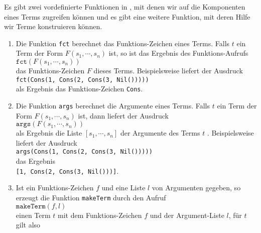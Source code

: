 Es gibt zwei vordefinierte Funktionen in \setl, mit denen wir auf die Komponenten eines Terms
zugreifen k\"{o}nnen und es gibt eine weitere Funktion, mit deren Hilfe wir Terme konstruieren k\"{o}nnen.
\begin{enumerate}
\item Die Funktion \texttt{fct} berechnet das Funktions-Zeichen eines Terms.
      Falls $t$ ein Term der Form $F(s_1,\cdots,s_n)$ ist, so ist das Ergebnis des Funktions-Aufrufs
      \\[0.2cm]
      \hspace*{1.3cm}
      $\texttt{fct}(F(s_1,\cdots,s_n))$
      \\[0.2cm]
      das Funktions-Zeichen $F$ dieses Terms.  Beispielsweise liefert der Ausdruck
      \\[0.2cm]
      \hspace*{1.3cm}
      \texttt{fct(Cons(1, Cons(2, Cons(3, Nil()))))}
      \\[0.2cm]
      als Ergebnis das Funktions-Zeichen \texttt{Cons}.
\item Die Funktion \texttt{args} berechnet die Argumente eines Terms.
      Falls $t$ ein Term der Form $F(s_1,\cdots,s_n)$ ist, dann liefert der Ausdruck
      \\[0.2cm]
      \hspace*{1.3cm}
      $\mathtt{args}(F(s_1,\cdots,s_n))$
      \\[0.2cm]
      als Ergebnis die Liste $[s_1, \cdots, s_n]$ der Argumente des Terms $t$  .  Beispielsweise
      liefert der Ausdruck
      \\[0.2cm]
      \hspace*{1.3cm}
      \texttt{args(Cons(1, Cons(2, Cons(3, Nil()))))}
      \\[0.2cm]
      das Ergebnis
      \\[0.2cm]
      \hspace*{1.3cm}
      \texttt{[1, Cons(2, Cons(3, Nil()))]}.
\item Ist ein Funktions-Zeichen $f$ und eine Liste $l$ von Argumenten gegeben, so erzeugt die
      Funktion \texttt{makeTerm} durch den Aufruf
      \\[0.2cm]
      \hspace*{1.3cm}
      $\texttt{makeTerm}(f,l)$
      \\[0.2cm]
      einen Term $t$ mit dem Funktions-Zeichen $f$ und der Argument-Liste $l$, f\"{u}r $t$ gilt also
      \\[0.2cm]
      \hspace*{1.3cm}

\end{enumerate}
